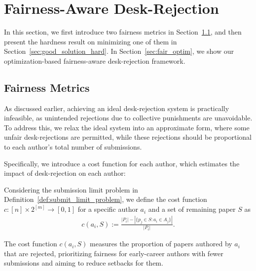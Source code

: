 \section{Fairness-Aware Desk-Rejection}\label{sec:fair}

In this section, we first introduce two fairness metrics in Section~\ref{sec:fair_metric}, and then present the hardness result on minimizing one of them in Section~\ref{sec:good_solution_hard}. In Section~\ref{sec:fair_optim}, we show our optimization-based fairness-aware desk-rejection framework. 

\subsection{Fairness Metrics}\label{sec:fair_metric}

As discussed earlier, achieving an ideal desk-rejection system is practically infeasible, as unintended rejections due to collective punishments are unavoidable. To address this, we relax the ideal system into an approximate form, where some unfair desk-rejections are permitted, while these rejections should be proportional to each author's total number of submissions.

Specifically, we introduce a cost function for each author, which estimates the impact of desk-rejection on each author:

\begin{definition}\label{def:cost}
Considering the submission limit problem in Definition~\ref{def:submit_limit_problem}, we define the cost function $c: [n] \times 2^{[m]} \to [0,1]$ for a specific author $a_i$ and a set of remaining paper $S$ as
\begin{align*}
    c(a_i, S) := \frac{|P_i| - |\{p_j \in S: a_i \in A_j\}|}{|P_i|}.
\end{align*}
\end{definition}

\begin{remark}
    The cost function $c(a_i,S)$ measures the proportion of papers authored by $a_i$ that are rejected, prioritizing fairness for early-career authors with fewer submissions and aiming to reduce setbacks for them.
\end{remark}

